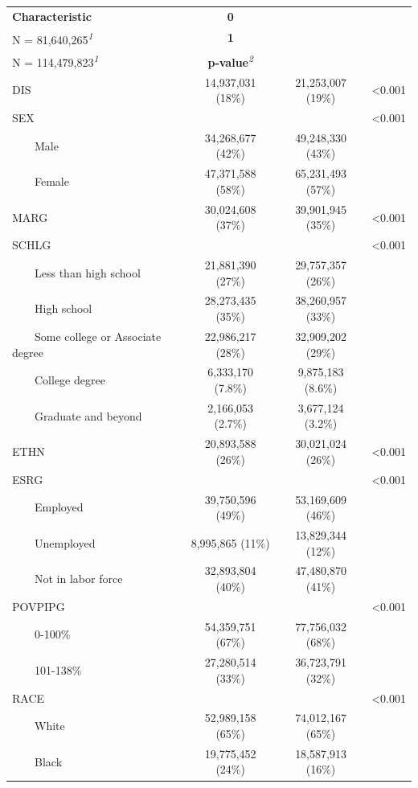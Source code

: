 \begin{table}[t]
\fontsize{12.0pt}{14.4pt}\selectfont
\begin{tabular*}{\linewidth}{@{\extracolsep{\fill}}lccc}
\toprule
\textbf{Characteristic} & \textbf{0}\\
N = 81,640,265\textsuperscript{\textit{1}} & \textbf{1}\\
N = 114,479,823\textsuperscript{\textit{1}} & \textbf{p-value}\textsuperscript{\textit{2}} \\ 
\midrule\addlinespace[2.5pt]
DIS & 14,937,031 (18\%) & 21,253,007 (19\%) & <0.001 \\ 
SEX &  &  & <0.001 \\ 
    Male & 34,268,677 (42\%) & 49,248,330 (43\%) &  \\ 
    Female & 47,371,588 (58\%) & 65,231,493 (57\%) &  \\ 
MARG & 30,024,608 (37\%) & 39,901,945 (35\%) & <0.001 \\ 
SCHLG &  &  & <0.001 \\ 
    Less than high school & 21,881,390 (27\%) & 29,757,357 (26\%) &  \\ 
    High school & 28,273,435 (35\%) & 38,260,957 (33\%) &  \\ 
    Some college or Associate degree & 22,986,217 (28\%) & 32,909,202 (29\%) &  \\ 
    College degree & 6,333,170 (7.8\%) & 9,875,183 (8.6\%) &  \\ 
    Graduate and beyond & 2,166,053 (2.7\%) & 3,677,124 (3.2\%) &  \\ 
ETHN & 20,893,588 (26\%) & 30,021,024 (26\%) & <0.001 \\ 
ESRG &  &  & <0.001 \\ 
    Employed & 39,750,596 (49\%) & 53,169,609 (46\%) &  \\ 
    Unemployed & 8,995,865 (11\%) & 13,829,344 (12\%) &  \\ 
    Not in labor force & 32,893,804 (40\%) & 47,480,870 (41\%) &  \\ 
POVPIPG &  &  & <0.001 \\ 
    0-100\% & 54,359,751 (67\%) & 77,756,032 (68\%) &  \\ 
    101-138\% & 27,280,514 (33\%) & 36,723,791 (32\%) &  \\ 
RACE &  &  & <0.001 \\ 
    White & 52,989,158 (65\%) & 74,012,167 (65\%) &  \\ 
    Black & 19,775,452 (24\%) & 18,587,913 (16\%) &  \\ 

\end{tabular*}
\end{table}
